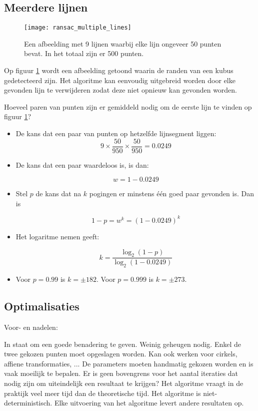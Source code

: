 \subsection{Meerdere lijnen}
\begin{figure}[t]
	\centering
	\texttt{[image: ransac\_multiple\_lines]}
	\caption{Een afbeelding met 9 lijnen waarbij elke lijn ongeveer 50 punten bevat. In het totaal zijn er 500 punten.}
	\label{fig:ransac_multiple_lines}
\end{figure}

Op figuur \ref{fig:ransac_multiple_lines} wordt een afbeelding getoond waarin de randen van een kubus gedetecteerd zijn. Het algoritme kan eenvoudig uitgebreid worden door elke gevonden lijn te verwijderen zodat deze niet opnieuw kan gevonden worden. 

Hoeveel paren van punten zijn er gemiddeld nodig om de eerste lijn te vinden op figuur \ref{fig:ransac_multiple_lines}?
\begin{itemize}
	\item De kans dat een paar van punten op hetzelfde lijnsegment liggen:
	$$9 \times \frac{50}{950} \times \frac{50}{950} = 0.0249$$
	\item De kans dat een paar waardeloos is, is dan:
	
	$$w = 1 - 0.0249$$
	
	\item Stel $p$ de kans dat na $k$ pogingen er minstens één goed paar gevonden is. Dan is 
	
	$$1 - p = w^k = (1 - 0.0249)^k$$
	
	\item Het logaritme nemen geeft:
	
	$$k = \frac{\log_2(1 - p)}{\log_2(1 - 0.0249)}$$
	
	\item Voor $p = 0.99$ is $ k = \pm 182$. Voor $p = 0.999$ is $k = \pm 273$.
\end{itemize}

\subsection{Optimalisaties}
Voor- en nadelen:
\begin{itemize}
	\good In staat om een goede benadering te geven. 
	\good Weinig geheugen nodig. Enkel de twee gekozen punten moet opgeslagen worden.
	\good Kan ook werken voor cirkels, affiene transformaties, ... 
	\alert De parameters moeten handmatig gekozen worden en is vaak moeilijk te bepalen.
	\alert Er is geen bovengrens voor het aantal iteraties dat nodig zijn om uiteindelijk een resultaat te krijgen?
	\alert Het algoritme vraagt in de praktijk veel meer tijd dan de theoretische tijd.
	\alert Het algoritme is niet-deterministisch. Elke uitvoering van het algoritme levert andere resultaten op.
\end{itemize}

